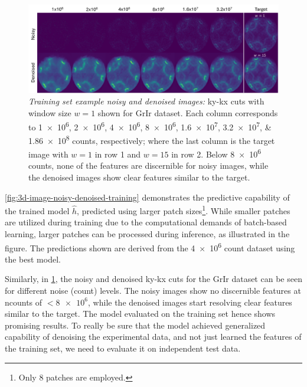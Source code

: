 \begin{figure}
    \centering
    \includegraphics[width=1\linewidth]{images/images_noisy_denoised_with_target.pdf}
    \caption{\textit{Training set example noisy and denoised images:} \gls{ky}-\gls{kx} cuts with window size $w=1$ shown for \gls{GrIr} dataset. Each column corresponds to \numlist{1e6;2e6;4e6;8e6;1.6e7;3.2e7;1.86e8} counts, respectively; where the last column is the target image with $w=1$ in row 1 and $w=15$ in row 2. Below \num{8e6} counts, none of the features are discernible for noisy images, while the denoised images show clear features similar to the target.}
    \label{fig:images-noisy-denoised-training}
\end{figure}

\cref{fig:3d-image-noisy-denoised-training} demonstrates the predictive capability of the trained model $\hat{h}$, predicted using larger patch sizes\footnote{Only \num{8} patches are employed.}. While smaller patches are utilized during training due to the computational demands of batch-based learning, larger patches can be processed during inference, as illustrated in the figure. The predictions shown are derived from the \num{4e6} count dataset using the best model.

Similarly, in \cref{fig:images-noisy-denoised-training}, the noisy and denoised \gls{ky}-\gls{kx} cuts for the \gls{GrIr} dataset can be seen for different noise (count) levels. The noisy images show no discernible features at \gls{ncounts} of $<\num{8e6}$, while the denoised images start resolving clear features similar to the target. The model evaluated on the training set hence shows promising results. To really be sure that the model achieved generalized capability of denoising the experimental data, and not just learned the features of the training set, we need to evaluate it on independent test data.

